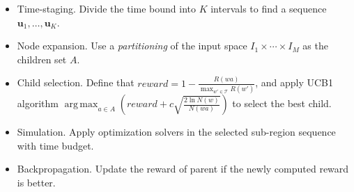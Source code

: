 \documentclass[a0paper,portrait]{baposter}
\DeclareMathOperator*{\argmax}{arg\,max}
\newcommand{\bu}{\mathbf{u}}
\begin{document}
\begin{poster}
{\begin{itemize}
\vspace{-0.8em}
\item Time-staging. Divide the time bound into $K$ intervals to find a sequence $\bu_{1},\dotsc,\bu_{K}$.


\vspace{-0.8em}
\item Node expansion. Use a \emph{partitioning} of the input space $I_{1}\times\cdots\times I_{M}$ as the children set $A$.
\vspace{-0.8em}

\item Child selection. Define that $reward = 1-\frac{R(wa)}{\max_{w'\in\mathcal{T}}R(w')}$, and apply UCB1 algorithm $\argmax_{a\in A} \left(reward + c\sqrt{\frac{2\ln N(w)}{N(wa)}}\right)$ to select the best child.
\vspace{-0.8em}

\item Simulation. Apply optimization solvers in the selected sub-region sequence with time budget.

\vspace{-0.8em}


\item Backpropagation. Update the reward of parent if the newly computed reward is better.


\end{itemize}


}



\end{poster}
\end{document}
